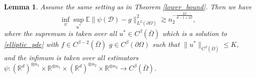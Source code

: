 \documentclass{article}
\newcommand{\R}{\mathbb{R}}
\newcommand{\E}{\mathbb{E}}
\newcommand{\D}{\mathcal{D}}
\theoremstyle{plain}
\newtheorem{lemma}[theorem]{Lemma}
\theoremstyle{definition}
\theoremstyle{remark}
\begin{document}
\begin{lemma} \label{lower_bound_boundary}
    Assume the same setting as in Theorem \ref{lower_bound}. Then we have
    \begin{equation*}
        \inf_\psi \sup_{u^*} \E
    \|\psi(\D) - g\|_{L^2(\partial \Omega)}^2 \gtrsim n_2^{-\frac{2\beta}{d-1 + 2\beta}},
    \end{equation*}
    where the supremum is taken over all $u^* \in C^\beta(\bar{\Omega})$ which is a solution to \eqref{elliptic_pde} with $f \in C^{\beta-2}(\bar{\Omega})$ $g \in C^\beta(\partial{\Omega})$ such that $\|u^*\|_{C^\beta(\bar{\Omega})} \leq K$, and the infimum is taken over all estimators $\psi: (\R^{d})^{\otimes n_1} \times \R^{\otimes n_1} \times (\R^d)^{\otimes n_2} \times \R^{\otimes n_2}\to C^\beta(\bar{\Omega})$.
\end{lemma}
\end{document}
